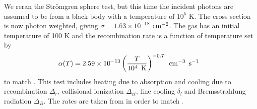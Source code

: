 \documentclass[fleq,usenatbib]{mnras}
\newcommand{\strom}{Str\"omgren}
\begin{document}
{We reran the \strom{} sphere test, but this time the incident photons are 
assumed to be from a black body with a temperature of $10^5$ K. The cross 
section is now photon weighted, giving 
$\sigma = 1.63 \times 10^{-18}$ $\rm cm^{-2}$. The gas has an initial 
temperature of 100 K and the recombination rate is a function of temperature 
set by
\begin{equation}
\alpha(T) = 2.59 \times 10^{-13} \left( \frac{T}{10^4 \hspace{5pt} 
{\rm K}}\right)^{-0.7} \hspace{5pt} {\rm cm}^{-3} \hspace{5pt} {\rm s}^{-1}
\end{equation}
to match \cite{petkovaSpringel09}. This test includes heating due to 
absorption and cooling due to recombination $\Delta_r$, collisional 
ionization $\Delta_{ci}$, line cooling $\delta_l$ and Bremsstrahlung 
radiation $\Delta_B$. The rates are taken from \cite{cen92} in order to
match \cite{petkovaSpringel09}.

}
\end{document}
